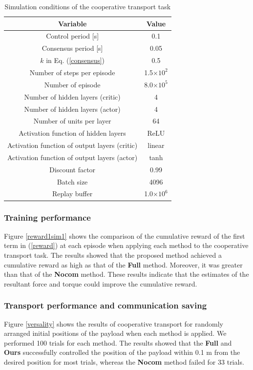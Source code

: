 \documentclass[letterpaper, 10 pt, conference]{ieeeconf} %
\begin{document}
\begin{table}
\caption{Simulation conditions of the cooperative transport task}
\label{sim_condition}
\centering
\renewcommand{\arraystretch}{1.1}
\begin{tabular}{cc}
\hline
Variable & Value \\
\hline
Control period [s] & 0.1 \\
Consensus period [s] & 0.05 \\
$k$ in Eq. (\ref{consensus}) & 0.5 \\
Number of steps per episode & 1.5$\times10^{2}$ \\
Number of episode & 8.0$\times10^{5}$ \\
Number of hidden layers (critic) & 4 \\
Number of hidden layers (actor) & 4 \\
Number of units per layer & 64 \\
Activation function of hidden layers & ReLU \\
Activation function of output layers (critic) & linear \\
Activation function of output layers (actor) & tanh \\
Discount factor & 0.99 \\
Batch size & 4096 \\
Replay buffer & 1.0$\times10^6$ \\
\hline
\end{tabular}
\label{sim1condition}
\end{table}

\subsubsection{Training performance}
Figure \ref{reward1sim1} shows the comparison of the cumulative reward of the first term in (\ref{reward}) at each episode when applying each method to the cooperative transport task.
The results showed that the proposed method achieved a cumulative reward as high as that of the \textbf{Full} method.
Moreover, it was greater than that of the \textbf{Nocom} method.
These results indicate that the estimates of the resultant force and torque could improve the cumulative reward.

\subsubsection{Transport performance and communication saving}
Figure \ref{versality} shows the results of cooperative transport for randomly arranged initial positions of the payload when each method is
applied. We performed 100 trials for each method.
The results showed that the \textbf{Full} and \textbf{Ours} successfully controlled the position of the payload within 0.1 m from the desired
position for most trials, whereas the \textbf{Nocom} method failed for 33 trials.
\end{document}
